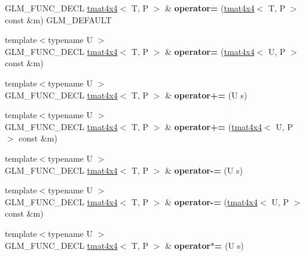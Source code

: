\begin{DoxyCompactItemize}
G\+L\+M\+\_\+\+F\+U\+N\+C\+\_\+\+D\+E\+CL \hyperlink{structglm_1_1tmat4x4}{tmat4x4}$<$ T, P $>$ \& {\bfseries operator=} (\hyperlink{structglm_1_1tmat4x4}{tmat4x4}$<$ T, P $>$ const \&m) G\+L\+M\+\_\+\+D\+E\+F\+A\+U\+LT
\item 
\mbox{\label{structglm_1_1tmat4x4_af78f51e2bde3b85554c4f48bcca0cbf6}} 
{\footnotesize template$<$typename U $>$ }\\G\+L\+M\+\_\+\+F\+U\+N\+C\+\_\+\+D\+E\+CL \hyperlink{structglm_1_1tmat4x4}{tmat4x4}$<$ T, P $>$ \& {\bfseries operator=} (\hyperlink{structglm_1_1tmat4x4}{tmat4x4}$<$ U, P $>$ const \&m)
\item 
\mbox{\label{structglm_1_1tmat4x4_abc9e0d2f169a0a1040aafb8a8df0d4e7}} 
{\footnotesize template$<$typename U $>$ }\\G\+L\+M\+\_\+\+F\+U\+N\+C\+\_\+\+D\+E\+CL \hyperlink{structglm_1_1tmat4x4}{tmat4x4}$<$ T, P $>$ \& {\bfseries operator+=} (U s)
\item 
\mbox{\label{structglm_1_1tmat4x4_a64f3faf32fe23ebc92896ccf2199c372}} 
{\footnotesize template$<$typename U $>$ }\\G\+L\+M\+\_\+\+F\+U\+N\+C\+\_\+\+D\+E\+CL \hyperlink{structglm_1_1tmat4x4}{tmat4x4}$<$ T, P $>$ \& {\bfseries operator+=} (\hyperlink{structglm_1_1tmat4x4}{tmat4x4}$<$ U, P $>$ const \&m)
\item 
\mbox{\label{structglm_1_1tmat4x4_a2b6efc926899fe1c11355d187eec5d29}} 
{\footnotesize template$<$typename U $>$ }\\G\+L\+M\+\_\+\+F\+U\+N\+C\+\_\+\+D\+E\+CL \hyperlink{structglm_1_1tmat4x4}{tmat4x4}$<$ T, P $>$ \& {\bfseries operator-\/=} (U s)
\item 
\mbox{\label{structglm_1_1tmat4x4_aa8385af8ad2d167f4111ab6346e4fd00}} 
{\footnotesize template$<$typename U $>$ }\\G\+L\+M\+\_\+\+F\+U\+N\+C\+\_\+\+D\+E\+CL \hyperlink{structglm_1_1tmat4x4}{tmat4x4}$<$ T, P $>$ \& {\bfseries operator-\/=} (\hyperlink{structglm_1_1tmat4x4}{tmat4x4}$<$ U, P $>$ const \&m)
\item 
\mbox{\label{structglm_1_1tmat4x4_ab5bcd63a0b03e90c074dbca6e8c8eaea}} 
{\footnotesize template$<$typename U $>$ }\\G\+L\+M\+\_\+\+F\+U\+N\+C\+\_\+\+D\+E\+CL \hyperlink{structglm_1_1tmat4x4}{tmat4x4}$<$ T, P $>$ \& {\bfseries operator$\ast$=} (U s)

\end{DoxyCompactItemize}
